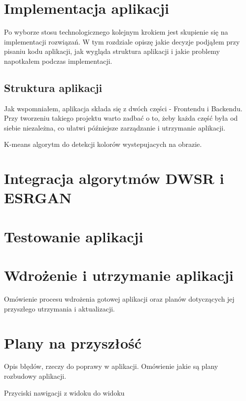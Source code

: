 \section{Implementacja aplikacji}

Po wyborze stosu technologicznego kolejnym krokiem jest skupienie się na implementacji rozwiązań. W tym rozdziale opiszę jakie decyzje podjąłem przy pisaniu kodu aplikacji, jak wygląda struktura aplikacji i jakie problemy napotkałem podczas implementacji.

\subsection*{Struktura aplikacji}

Jak wspomniałem, aplikacja składa się z dwóch części - Frontendu i Backendu. 
Przy tworzeniu takiego projektu warto zadbać o to, żeby każda część była od siebie niezależna, co ułatwi późniejsze zarządzanie i utrzymanie aplikacji. 


K-means algorytm do detekcji kolorów wystepujacych na obrazie.










\section{Integracja algorytmów DWSR i ESRGAN}




\section{Testowanie aplikacji}




\section{Wdrożenie i utrzymanie aplikacji}

Omówienie procesu wdrożenia gotowej aplikacji oraz planów dotyczących jej przyszłego utrzymania i aktualizacji.



\section{Plany na przyszłość} \label{sec:plans}

Opis błędów, rzeczy do poprawy w aplikacji. Omówienie jakie są plany rozbudowy aplikacji.

Przyciski nawigacji z widoku do widoku